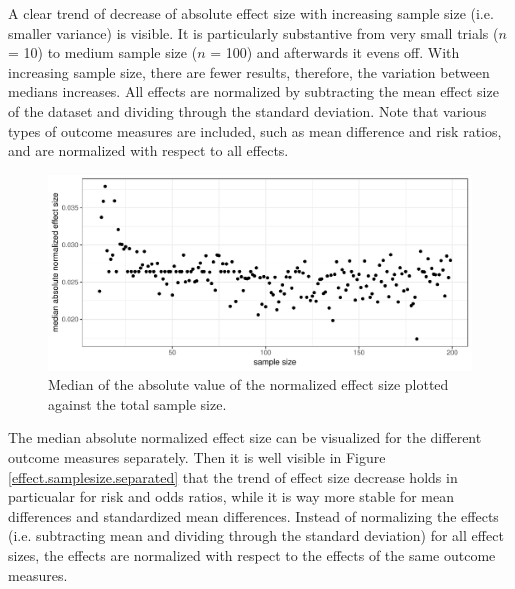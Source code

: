 \documentclass[11pt,a4paper,twoside]{book}\usepackage[]{graphicx}\usepackage[]{color}
\newenvironment{knitrout}{}{} %
\begin{document}
\vspace{0mm}
A clear trend of decrease of absolute effect size with increasing sample size (i.e. smaller variance) is visible. It is particularly substantive from very small trials ($n$ = 10) to medium sample size ($n$ = 100) and afterwards it evens off. With increasing sample size, there are fewer results, therefore, the variation between medians increases. All effects are normalized by subtracting the mean effect size of the dataset and dividing through the standard deviation. Note that various types of outcome measures are included, such as mean difference and risk ratios, and are normalized with respect to all effects.

\begin{figure}
\begin{knitrout}
\color{fgcolor}

{\centering \includegraphics[width=\textwidth-3cm]{figure/ch02_figunnamed-chunk-22-1} 

}



\end{knitrout}
\caption{Median of the absolute value of the normalized effect size plotted against the total sample size.}
\label{effect.samplesize}
\end{figure}

The median absolute normalized effect size can be visualized for the different outcome measures separately. Then it is well visible in Figure \ref{effect.samplesize.separated} that the trend of effect size decrease holds in particualar for risk and odds ratios, while it is way more stable for mean differences and standardized mean differences. Instead of normalizing the effects (i.e. subtracting mean and dividing through the standard deviation) for all effect sizes, the effects are normalized with respect to the effects of the same outcome measures. 
\end{document}
